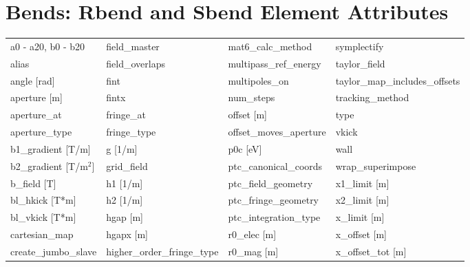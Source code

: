  \section{Bends: Rbend and Sbend Element Attributes}
 \label{s:list.bend}
 
 \begin{tabular}{llll} \toprule
a0 - a20, b0 - b20               & field_master                     & mat6_calc_method                 & symplectify                      \\
alias                            & field_overlaps                   & multipass_ref_energy             & taylor_field                     \\
angle [rad]                      & fint                             & multipoles_on                    & taylor_map_includes_offsets      \\
aperture [m]                     & fintx                            & num_steps                        & tracking_method                  \\
aperture_at                      & fringe_at                        & offset [m]                       & type                             \\
aperture_type                    & fringe_type                      & offset_moves_aperture            & vkick                            \\
b1_gradient [T/m]                & g [1/m]                          & p0c [eV]                         & wall                             \\
b2_gradient [T/m$^2$]            & grid_field                       & ptc_canonical_coords             & wrap_superimpose                 \\
b_field [T]                      & h1 [1/m]                         & ptc_field_geometry               & x1_limit [m]                     \\
bl_hkick [T*m]                   & h2 [1/m]                         & ptc_fringe_geometry              & x2_limit [m]                     \\
bl_vkick [T*m]                   & hgap [m]                         & ptc_integration_type             & x_limit [m]                      \\
cartesian_map                    & hgapx [m]                        & r0_elec [m]                      & x_offset [m]                     \\
create_jumbo_slave               & higher_order_fringe_type         & r0_mag [m]                       & x_offset_tot [m]                 \\

\end{tabular}
